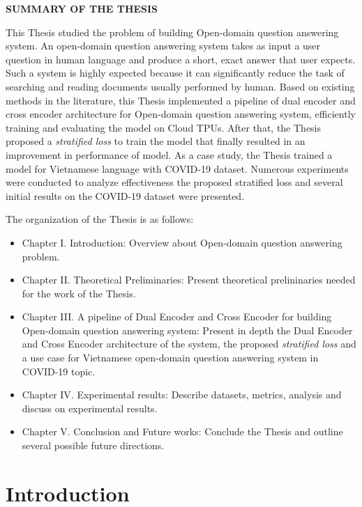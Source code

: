 \documentclass[12pt, sort&compress]{report}
\begin{document}
\newpage
\begin{center}
	\fontsize{20}{\baselineskip}\selectfont\sf\bfseries SUMMARY OF THE THESIS
\end{center}
This Thesis studied the problem of building Open-domain question answering system. An open-domain question answering system takes as input a user question in human language and produce a short, exact answer that user expects. Such a system is highly expected because it can significantly reduce the task of searching and reading documents usually performed by human. Based on existing methods in the literature, this Thesis implemented a pipeline of dual encoder and cross encoder architecture for Open-domain question answering system, efficiently training and evaluating the model on Cloud TPUs. After that, the Thesis proposed a \textit{stratified loss} to train the model that finally resulted in an improvement in performance of model. As a case study, the Thesis trained a model for Vietnamese language with COVID-19 dataset. Numerous experiments were conducted to analyze effectiveness the proposed stratified loss and several initial results on the COVID-19 dataset were presented.
\par The organization of the Thesis is as follows:
\begin{itemize}
	\item Chapter I. Introduction: Overview about Open-domain question answering problem.
	\item Chapter II. Theoretical Preliminaries: Present theoretical prelininaries needed for the work of the Thesis.
	\item Chapter III. A pipeline of Dual Encoder and Cross Encoder for building Open-domain question answering system: Present in depth the Dual Encoder and Cross Encoder architecture of the system, the proposed \textit{stratified loss} and a use case for Vietnamese open-domain question answering system in COVID-19 topic.
	\item Chapter IV. Experimental results: Describe datasets, metrics, analysis and discuss on experimental results.
	\item Chapter V. Conclusion and Future works: Conclude the Thesis and outline several possible future directions.
\end{itemize}
\chapter{Introduction}
\label{chap:01}
\end{document}
